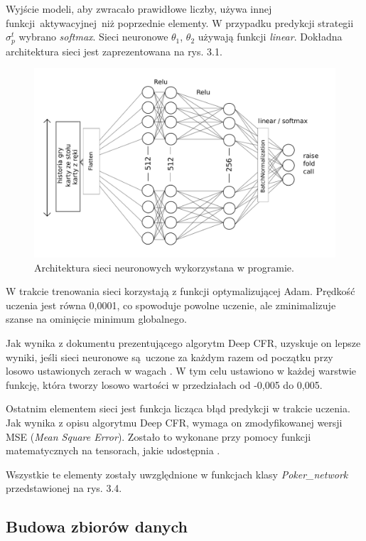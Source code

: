 \documentclass[12pt,oneside,a4paper]{report}
\begin{document}
Wyjście modeli, aby zwracało prawidłowe liczby, używa innej funkcji aktywacyjnej niż poprzednie
elementy. W przypadku predykcji
strategii $\sigma_{p}^{t}$ wybrano \emph{softmax}. 
Sieci neuronowe $\theta_{1}$, $\theta_{2}$ używają funkcji \emph{linear}.
Dokładna architektura sieci jest zaprezentowana na rys. 3.1.


\begin{figure}[!ht]
  \centering
  \includegraphics[width=1\textwidth]{./img/nn.pdf}
  \caption{Architektura sieci neuronowych wykorzystana w programie.}
\end{figure}


W trakcie trenowania sieci korzystają z funkcji optymalizującej Adam.
Prędkość uczenia jest równa 0,0001, co spowoduje powolne uczenie, ale zminimalizuje szanse na
ominięcie minimum globalnego. 

Jak wynika z dokumentu prezentującego algorytm Deep CFR, uzyskuje on lepsze wyniki, jeśli sieci
neuronowe są uczone za każdym razem od początku przy losowo ustawionych zerach w wagach \cite{DCFR}. 
W tym celu ustawiono w każdej warstwie funkcję, która tworzy losowo wartości w przedziałach od
-0,005 do 0,005.

Ostatnim elementem sieci jest funkcja licząca błąd predykcji w trakcie uczenia. Jak wynika z 
opisu algorytmu Deep CFR, wymaga on zmodyfikowanej wersji MSE (\emph{Mean Square Error}).
Zostało to wykonane przy pomocy 
funkcji matematycznych na tensorach, jakie udostępnia  \cite{tensorflow}.

Wszystkie te elementy zostały uwzględnione w funkcjach klasy \emph{Poker\_network} przedstawionej na
rys. 3.4.


\subsection{Budowa zbiorów danych}
\end{document}
